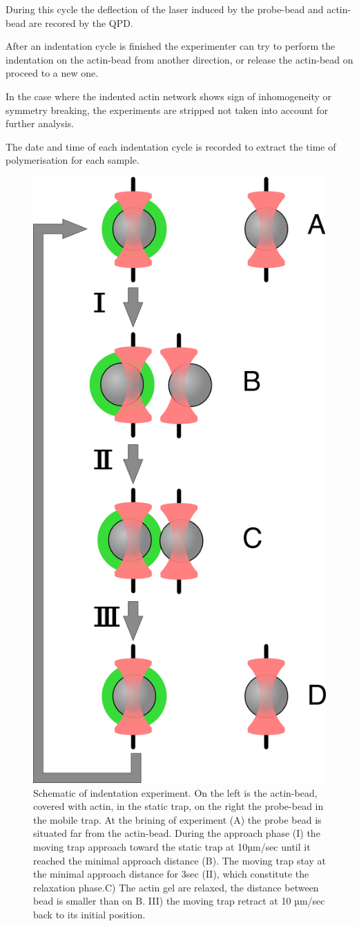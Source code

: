 \documentclass[A4paperpaper,11pt,english]{sphinxmanual}
\begin{document}
During this cycle the deflection of the laser induced by the probe-bead and
actin-bead are recored by the QPD.

After an indentation cycle is finished the experimenter can try to perform the
indentation on the actin-bead from another direction, or release the actin-bead
on proceed to a new one.

In the case where the indented actin network shows sign of inhomogeneity or
symmetry breaking, the experiments are stripped not taken into account for
further analysis.

The date and time of each indentation cycle is recorded to extract the time of
polymerisation for each sample.
\begin{figure}[htbp]
\centering
\capstart

\includegraphics[width=0.500\linewidth]{beed_move.png}
\caption{Schematic of indentation experiment. On the left is the actin-bead, covered
with actin, in the static trap, on the right the probe-bead in the mobile
trap. At the brining of experiment (A) the probe bead is situated far from
the actin-bead. During the approach phase (I) the moving trap approach
toward the static trap at 10µm/sec until it reached the minimal approach
distance (B). The moving trap stay at the minimal approach distance for
3sec (II), which constitute the relaxation phase.C) The actin gel are
relaxed, the distance between bead is smaller than on B. III) the moving
trap retract at 10 µm/sec back to its initial position.}\label{parts/part2:bead-move}\end{figure}
\end{document}

